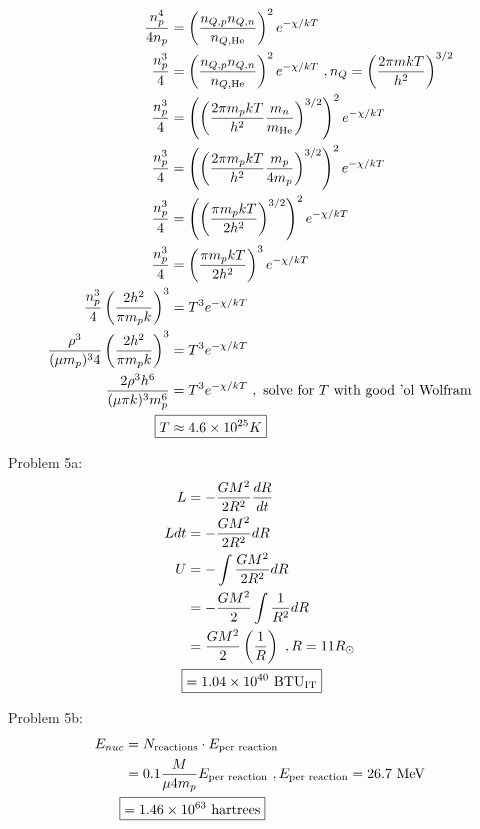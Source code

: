 \documentclass[10pt,letter,preprint]{aastex}
\newcommand{\rp}{\right)}
\newcommand{\lp}{\left(}
\begin{document}
\begin{align}
\frac{n_{p}^{4}}{4n_{p}} &=  \lp \frac{ n_{Q,p} n_{Q,n} }{ n_{Q,\textrm{He}}}\rp^{2} e^{-\chi/kT}\\
\frac{n_{p}^{3}}{4} &=  \lp \frac{ n_{Q,p} n_{Q,n} }{ n_{Q,\textrm{He}}}\rp^{2} e^{-\chi/kT}~,n_{Q} = \lp \frac{2\pi mkT}{h^{2}} \rp^{3/2}\\
\frac{n_{p}^{3}}{4} &=  \lp\lp \frac{2\pi m_{p} kT}{h^{2}} \frac{m_{n}}{ m_{\textrm{He}}}\rp^{3/2} \rp^{2} e^{-\chi/kT}\\
\frac{n_{p}^{3}}{4} &=  \lp\lp \frac{2\pi m_{p} kT}{h^{2}} \frac{m_{p}}{ 4m_{p}}\rp^{3/2} \rp^{2} e^{-\chi/kT}\\
\frac{n_{p}^{3}}{4} &=  \lp\lp \frac{\pi m_{p} kT}{2h^{2}} \rp^{3/2} \rp^{2} e^{-\chi/kT}\\
\frac{n_{p}^{3}}{4} &=  \lp \frac{\pi m_{p} kT}{2h^{2}} \rp^{3} e^{-\chi/kT}\\
\frac{n_{p}^{3}}{4} \lp \frac{2h^{2}}{\pi m_{p} k} \rp^{3} &= T^{3} e^{-\chi/kT}\\
\frac{\rho^{3}}{(\mu m_{p})^{3}4} \lp \frac{2h^{2}}{\pi m_{p} k} \rp^{3} &= T^{3} e^{-\chi/kT}\\
\frac{2 \rho^{3} h^{6}}{(\mu \pi k)^{3}m_{p}^{6}} &= T^{3} e^{-\chi/kT}~,\textrm{ solve for $T$ with good 'ol Wolfram}\\
\Aboxed{T &\approx 4.6 \times 10^{25} K} 
\end{align}

Problem 5a:\\
\begin{align}
L &= -\frac{GM^2}{2R^2} \frac{dR}{dt}\\
Ldt &=  -\frac{GM^2}{2R^2} dR\\
U &=- \int \frac{GM^2}{2R^2}dR\\
&= -\frac{GM^2}{2} \int \frac{1}{R^2}dR\\
&= \frac{GM^2}{2} \lp \frac{1}{R} \rp~,R=11R_\odot\\
\Aboxed{&= 1.04 \times 10^{40}\textrm{ BTU$_{\textrm{IT}}$}} %
\end{align}

Problem 5b:\\
\begin{align}
E_{nuc} &= N_{\textrm{reactions}} \cdot  E_{\textrm{per reaction}}\\
&= 0.1 \frac{M}{\mu 4 m_p} E_{\textrm{per reaction}}~, E_{\textrm{per reaction}} = 26.7\textrm{ MeV}\\
\Aboxed{&= 1.46 \times 10^{63} \textrm{ hartrees}} %
\end{align}
\end{document}
